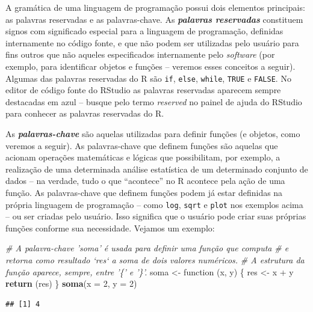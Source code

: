 \documentclass[]{book}
\newenvironment{Shaded}{\begin{snugshade}}{\end{snugshade}}
\newcommand{\KeywordTok}[1]{\textcolor[rgb]{0.13,0.29,0.53}{\textbf{{#1}}}}
\newcommand{\DataTypeTok}[1]{\textcolor[rgb]{0.13,0.29,0.53}{{#1}}}
\newcommand{\DecValTok}[1]{\textcolor[rgb]{0.00,0.00,0.81}{{#1}}}
\newcommand{\StringTok}[1]{\textcolor[rgb]{0.31,0.60,0.02}{{#1}}}
\newcommand{\CommentTok}[1]{\textcolor[rgb]{0.56,0.35,0.01}{\textit{{#1}}}}
\newcommand{\NormalTok}[1]{{#1}}
\begin{document}
A gramática de uma linguagem de programação possui dois elementos
principais: as palavras reservadas e as palavras-chave. As
\textbf{\emph{palavras reservadas}} constituem signos com significado
especial para a linguagem de programação, definidas internamente no
código fonte, e que não podem ser utilizadas pelo usuário para fins
outros que não aqueles especificados internamente pelo \emph{software}
(por exemplo, para identificar objetos e funções -- veremos esses
conceitos a seguir). Algumas das palavras reservadas do R são
\texttt{if}, \texttt{else}, \texttt{while}, \texttt{TRUE} e
\texttt{FALSE}. No editor de código fonte do RStudio as palavras
reservadas aparecem sempre destacadas em azul -- busque pelo termo
\emph{reserved} no painel de ajuda do RStudio para conhecer as palavras
reservadas do R.

As \textbf{\emph{palavras-chave}} são aquelas utilizadas para definir
funções (e objetos, como veremos a seguir). As palavras-chave que
definem funções são aquelas que acionam operações matemáticas e lógicas
que possibilitam, por exemplo, a realização de uma determinada análise
estatística de um determinado conjunto de dados -- na verdade, tudo o
que ``acontece'' no R acontece pela ação de uma função. As
palavras-chave que definem funções podem já estar definidas na própria
linguagem de programação -- como \texttt{log}, \texttt{sqrt} e
\texttt{plot} nos exemplos acima -- ou ser criadas pelo usuário. Isso
significa que o usuário pode criar suas próprias funções conforme sua
necessidade. Vejamos um exemplo:

\begin{Shaded}
\begin{Highlighting}[]
\CommentTok{# A palavra-chave 'soma' é usada para definir uma função que computa}
\CommentTok{# e retorna como resultado `res` a soma de dois valores numéricos.}
\CommentTok{# A estrutura da função aparece, sempre, entre '\{' e '\}'.}
\NormalTok{soma <-}\StringTok{ }
\StringTok{  }\NormalTok{function (x, y) \{ }
    \NormalTok{res <-}\StringTok{ }\NormalTok{x +}\StringTok{ }\NormalTok{y}
    \KeywordTok{return} \NormalTok{(res)}
    \NormalTok{\}}
\KeywordTok{soma}\NormalTok{(}\DataTypeTok{x =} \DecValTok{2}\NormalTok{, }\DataTypeTok{y =} \DecValTok{2}\NormalTok{)}
\end{Highlighting}
\end{Shaded}

\begin{verbatim}
## [1] 4
\end{verbatim}
\end{document}
